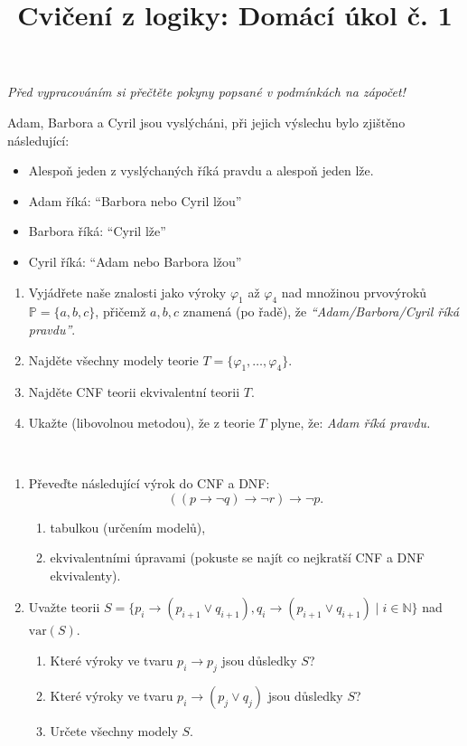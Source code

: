 \documentclass[a4paper]{amsart}
\title{\sc Cvičení z logiky: Domácí úkol č. 1}
\theoremstyle{definition}
\begin{document}
\medskip\begin{ukol}[2 body]
    {\it Před vypracováním si přečtěte pokyny popsané v podmínkách na zápočet!}
        
    \medskip    
        
    Adam, Barbora a Cyril jsou vyslýcháni, při jejich výslechu bylo zjištěno následující:
    \begin{itemize}\it
        \item Alespoň jeden z vyslýchaných říká pravdu a alespoň jeden lže.
        \item Adam říká: ``Barbora nebo Cyril lžou''
        \item Barbora říká: ``Cyril lže''
        \item Cyril říká: ``Adam nebo Barbora lžou''
    \end{itemize}
    \begin{enumerate}
        \item Vyjádřete naše znalosti jako výroky $\varphi_1$ až $\varphi_4$ nad množinou prvovýroků $\mathbb{P}=\{a,b,c\}$, přičemž $a,b,c$ znamená (po řadě), že {\it ``Adam/Barbora/Cyril říká pravdu''}.
        \item Najděte všechny modely teorie $T = \{\varphi_1, \dots, \varphi_4\}$.
        \item Najděte CNF teorii ekvivalentní teorii $T$.
        \item Ukažte (libovolnou metodou), že z teorie $T$ plyne, že: {\it Adam říká pravdu.}
    \end{enumerate}    
    \end{ukol}



    \medskip\begin{ukol}[2 body]{\,}
        \begin{enumerate}[label=\arabic*.]
            \item Převeďte následující výrok do CNF a DNF:
            $$
            ((p\to \neg q) \to \neg r) \to \neg p.
            $$
            \begin{enumerate}
                \item tabulkou (určením modelů),
                \item ekvivalentními úpravami (pokuste se najít co nejkratší CNF a DNF ekvivalenty).
            \end{enumerate}
            \item Uvažte  teorii $S=\{p_i \to (p_{i+1} \vee q_{i+1}), q_i \to (p_{i+1} \vee q_{i+1}) \mid i\in \mathbb{N}\}$ nad $\mathrm{var}(S)$.
            \begin{enumerate}
                    \item Které výroky ve tvaru  $p_i \to p_j$ jsou důsledky $S$?
                    \item Které výroky ve tvaru  $p_i \to (p_j \vee q_j)$ jsou důsledky $S$?
                    \item Určete všechny modely $S$.
            \end{enumerate}
        \end{enumerate} 
        \end{ukol}
\end{document}
